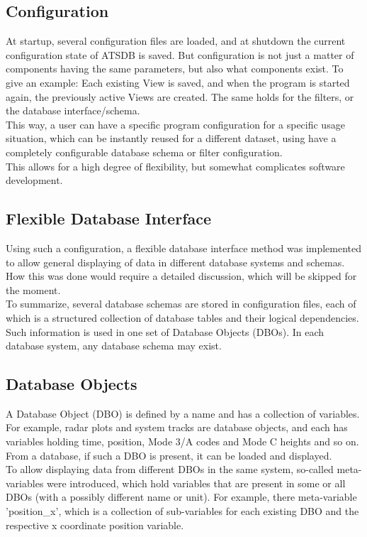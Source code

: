 \documentclass[10pt,letterpaper,extrafontsizes]{memoir}
\begin{document}
\subsection{Configuration}
At startup, several configuration files are loaded, and at shutdown the current configuration state of ATSDB is saved.  But configuration is not just a matter of components having the same parameters, but also what components exist. To give an example: Each existing View is saved, and when the program is started again, the previously active Views are created.  The same holds for the filters, or the database interface/schema. \\
This way, a user can have a specific program configuration for a specific usage situation, which can be instantly reused for a different dataset, using have a completely configurable database schema or filter configuration. \\
This allows for a high degree of flexibility, but somewhat complicates software development.

\subsection{Flexible Database Interface}
Using such a configuration, a flexible database interface method was implemented to allow general displaying of data in different database systems and schemas.  How this was done would require a detailed discussion, which will be skipped for the moment.\\
To summarize, several database schemas are stored in configuration files, each of which is a structured collection of database tables and their logical dependencies. Such information is used in one set of Database Objects (DBOs). In each database system, any database schema may exist.

\subsection{Database Objects}
A Database Object (DBO) is defined by a name and has a collection of variables. For example, radar plots and system tracks are database objects, and each has variables holding time, position, Mode 3/A codes and Mode C heights and so on. From a database, if such a DBO is present, it can be loaded and displayed.\\

To allow displaying data from different DBOs in the same system, so-called meta-variables were  introduced, which hold variables that are present in some or all DBOs (with a possibly different name or unit).  For example, there meta-variable 'position\_x', which is a collection of sub-variables for each existing DBO and the respective x coordinate position variable.
\end{document}
